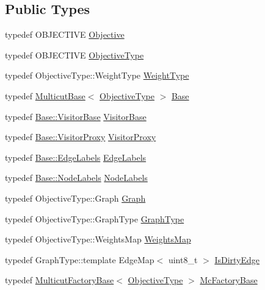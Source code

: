 \subsection*{Public Types}
\begin{DoxyCompactItemize}
\item 
typedef O\+B\+J\+E\+C\+T\+I\+V\+E \hyperlink{classnifty_1_1graph_1_1BlockMulticut_a5a0258cebb392718a4565551cd43ab89}{Objective}
\item 
typedef O\+B\+J\+E\+C\+T\+I\+V\+E \hyperlink{classnifty_1_1graph_1_1BlockMulticut_a1b38a95ca33ba1eaed19e994484c58fc}{Objective\+Type}
\item 
typedef Objective\+Type\+::\+Weight\+Type \hyperlink{classnifty_1_1graph_1_1BlockMulticut_a5c18649d14bae96da8d0c6359c57673a}{Weight\+Type}
\item 
typedef \hyperlink{classnifty_1_1graph_1_1MulticutBase}{Multicut\+Base}$<$ \hyperlink{classnifty_1_1graph_1_1BlockMulticut_a1b38a95ca33ba1eaed19e994484c58fc}{Objective\+Type} $>$ \hyperlink{classnifty_1_1graph_1_1BlockMulticut_a6ca8b03b1ff07bfcbc7a76b7c0b5dbda}{Base}
\item 
typedef \hyperlink{classnifty_1_1graph_1_1MulticutBase_a5882fb69df59d8113f6a81a0dac26eaa}{Base\+::\+Visitor\+Base} \hyperlink{classnifty_1_1graph_1_1BlockMulticut_a7338bedc1f9032f950cfc3a2ca446a17}{Visitor\+Base}
\item 
typedef \hyperlink{classnifty_1_1graph_1_1MulticutBase_a6ede271a3cb0ae4711a7e9da2b07efa9}{Base\+::\+Visitor\+Proxy} \hyperlink{classnifty_1_1graph_1_1BlockMulticut_a47cf68caa6860e2e05a55b10ac73d39d}{Visitor\+Proxy}
\item 
typedef \hyperlink{classnifty_1_1graph_1_1MulticutBase_aaeefe3c5df81d9c9efffec878cf2fcd7}{Base\+::\+Edge\+Labels} \hyperlink{classnifty_1_1graph_1_1BlockMulticut_a5aaec5810245dab0540ea428f771eeb2}{Edge\+Labels}
\item 
typedef \hyperlink{classnifty_1_1graph_1_1MulticutBase_afba61ad2919d0fad20b3745af19309da}{Base\+::\+Node\+Labels} \hyperlink{classnifty_1_1graph_1_1BlockMulticut_a5ee7c08b785b538685e3e30a93586d39}{Node\+Labels}
\item 
typedef Objective\+Type\+::\+Graph \hyperlink{classnifty_1_1graph_1_1BlockMulticut_a5b1f16a5619ee57423c662797066b4ab}{Graph}
\item 
typedef Objective\+Type\+::\+Graph\+Type \hyperlink{classnifty_1_1graph_1_1BlockMulticut_aa4c491df2afb630fd1a9897a2bc24d89}{Graph\+Type}
\item 
typedef Objective\+Type\+::\+Weights\+Map \hyperlink{classnifty_1_1graph_1_1BlockMulticut_a4bb4ad199019ba7e70c905d6316413c2}{Weights\+Map}
\item 
typedef Graph\+Type\+::template Edge\+Map$<$ uint8\+\_\+t $>$ \hyperlink{classnifty_1_1graph_1_1BlockMulticut_afa9cc25eb3e220d66fffaa687f18f4ad}{Is\+Dirty\+Edge}
\item 
typedef \hyperlink{classnifty_1_1graph_1_1MulticutFactoryBase}{Multicut\+Factory\+Base}$<$ \hyperlink{classnifty_1_1graph_1_1BlockMulticut_a1b38a95ca33ba1eaed19e994484c58fc}{Objective\+Type} $>$ \hyperlink{classnifty_1_1graph_1_1BlockMulticut_a59d6c0f5c4f2b8cf5c715371fab907a7}{Mc\+Factory\+Base}
\end{DoxyCompactItemize}

